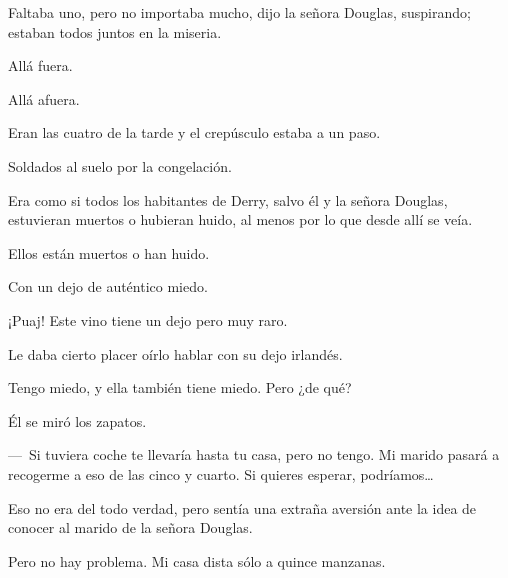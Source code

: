 \sk
Faltaba uno, pero no importaba mucho,
dijo la señora Douglas, suspirando; estaban todos
juntos en la miseria.

\sk
Allá fuera.

\sk
Allá afuera.

\sk
Eran las cuatro de la tarde y el
crepúsculo estaba a un paso.

\sk
Soldados al suelo por la congelación.

\sk
Era como si todos los habitantes de Derry, salvo él
y la señora Douglas, estuvieran muertos o
hubieran huido, al menos por lo que desde allí se veía.

\sk
Ellos están muertos o han huido.

\sk
Con un dejo de auténtico miedo.

\sk
¡Puaj! Este vino tiene un dejo pero muy raro.

\sk
Le daba cierto placer oírlo hablar con su dejo irlandés.

\sk
Tengo miedo, y ella también
tiene miedo. Pero ¿de qué?

\sk
Él se miró los zapatos.

\sk
---~Si tuviera coche te llevaría hasta tu casa,
pero no tengo. Mi marido pasará a recogerme a
eso de las cinco y cuarto. Si quieres esperar,
podríamos\ldots{}

\sk
Eso no era del todo verdad, pero sentía una
extraña aversión ante la idea de conocer al marido
de la señora Douglas.

\sk
Pero no hay problema. Mi casa dista sólo a quince manzanas.

